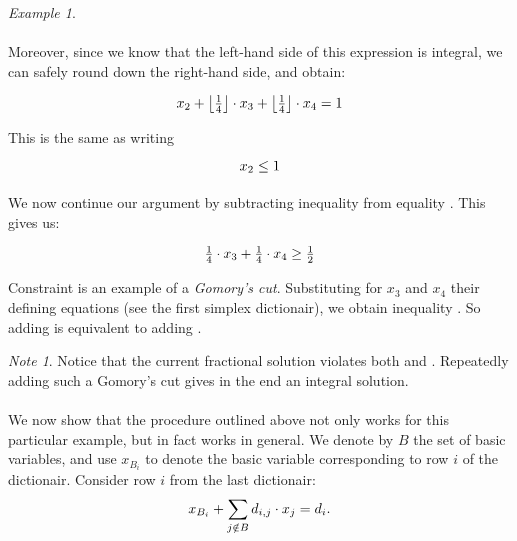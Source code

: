 \documentclass[titlepage]{book}
\makeatletter
\newcommand{\concept}[1]{\toindex{#1}\indexlayout{#1}}
\newcommand{\indexlayout}[1]{\emph{#1}}
\newcommand\toindex{\@ifstar{\@dblarg{\@toindexs}}{\@toindex}}
\def\@toindexs[#1]#2{\index{#1@#2}}
\newcommand\@toindex[2][]{%
  \if\relax\detokenize{#1}\relax
    \begingroup
    \@splitword#2\@nil%
    \uppercase\expandafter{%
      \expandafter\def\expandafter\@initial\expandafter{\@first}}%
    \toks0=\expandafter{\@initial}%
    \toks2=\expandafter{\@rest}%
    \edef\x{\endgroup\noexpand\index{\the\toks0 \the\toks2 }}\x
  \else
    \index{#1}
  \fi
}
\def\@splitword#1#2\@nil{\def\@first{#1}\def\@rest{#2}}
\theoremstyle{plain}
\theoremstyle{definition}
\theoremstyle{remark}
\newtheorem{example}{Example}
\newtheorem{note}{Note}
\makeatother
\begin{document}
\begin{example}
\paragraph{}
Moreover, since we know that the left-hand side of this expression is integral, we can safely round down the right-hand side, and obtain:

\begin{equation}
x_2+\left\lfloor \tfrac{1}{4} \right\rfloor\cdot x_3+\left\lfloor \tfrac{1}{4} \right\rfloor\cdot x_4=1
\end{equation}

This is the same as writing

\begin{equation}
x_2\leq 1\eqnlab{cg-cut-eq2-fin}
\end{equation}

\paragraph{}
We now continue our argument by subtracting inequality  from equality . This gives us:

\begin{equation}
\eqnlab{gomoryscut_example}
\tfrac{1}{4}\cdot x_3+\tfrac{1}{4}\cdot x_4\geq\tfrac{1}{2}
\end{equation}

Constraint  is an example of a \concept{Gomory's cut}. Substituting for $x_3$ and $x_4$ their defining equations (see the first simplex dictionair), we obtain inequality . So adding  is equivalent to adding .
\end{example}

\begin{note}
Notice that the current fractional solution violates both  and . Repeatedly adding such a Gomory's cut gives in the end an integral solution.
\end{note}

\paragraph{}
We now show that the procedure outlined above not only works for this particular example, but in fact works in general. We denote by $B$ the set of basic variables, and use $x_{B_i}$ to denote the basic variable corresponding to row $i$ of the dictionair. Consider row $i$ from the last dictionair:
\begin{equation}
x_{B_i}+\sumndomain[j]{B}{d_{i,j}\cdot x_j}=d_i.\eqnlab{gc-theory1}
\end{equation}
\end{document}
